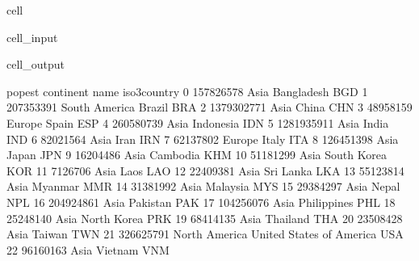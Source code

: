 \documentclass[letterpaper,10pt,english]{jupyterBook}
\begin{document}
\begin{sphinxuseclass}{cell}\begin{sphinxVerbatimInput}

\begin{sphinxuseclass}{cell_input}
\begin{sphinxVerbatim}[commandchars=\\\{\}]
\end{sphinxVerbatim}

\end{sphinxuseclass}\end{sphinxVerbatimInput}
\begin{sphinxVerbatimOutput}

\begin{sphinxuseclass}{cell_output}
\begin{sphinxVerbatim}[commandchars=\\\{\}]
       pop\PYGZus{}est      continent                      name iso3\PYGZus{}country  \PYGZbs{}
0    157826578           Asia                Bangladesh          BGD   
1    207353391  South America                    Brazil          BRA   
2   1379302771           Asia                     China          CHN   
3     48958159         Europe                     Spain          ESP   
4    260580739           Asia                 Indonesia          IDN   
5   1281935911           Asia                     India          IND   
6     82021564           Asia                      Iran          IRN   
7     62137802         Europe                     Italy          ITA   
8    126451398           Asia                     Japan          JPN   
9     16204486           Asia                  Cambodia          KHM   
10    51181299           Asia               South Korea          KOR   
11     7126706           Asia                      Laos          LAO   
12    22409381           Asia                 Sri Lanka          LKA   
13    55123814           Asia                   Myanmar          MMR   
14    31381992           Asia                  Malaysia          MYS   
15    29384297           Asia                     Nepal          NPL   
16   204924861           Asia                  Pakistan          PAK   
17   104256076           Asia               Philippines          PHL   
18    25248140           Asia               North Korea          PRK   
19    68414135           Asia                  Thailand          THA   
20    23508428           Asia                    Taiwan          TWN   
21   326625791  North America  United States of America          USA   
22    96160163           Asia                   Vietnam          VNM   


\end{sphinxVerbatim}
\end{sphinxuseclass}
\end{sphinxVerbatimOutput}
\end{sphinxuseclass}
\end{document}
